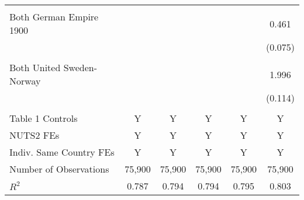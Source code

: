 {\begin{tabular}{l*{5}{c}}
            &                     &                     &                     &                     &                     \\
Both German Empire 1900&                     &                     &                     &                     &       0.461\sym{***}\\
            &                     &                     &                     &                     &     (0.075)         \\
            &                     &                     &                     &                     &                     \\
Both United Sweden-Norway&                     &                     &                     &                     &       1.996\sym{***}\\
            &                     &                     &                     &                     &     (0.114)         \\
            &                     &                     &                     &                     &                     \\
\hline
Table 1 Controls&           Y         &           Y         &           Y         &           Y         &           Y         \\
NUTS2 FEs   &           Y         &           Y         &           Y         &           Y         &           Y         \\
Indiv. Same Country FEs&           Y         &           Y         &           Y         &           Y         &           Y         \\
Number of Observations&      75,900         &      75,900         &      75,900         &      75,900         &      75,900         \\
$R^2$       &       0.787         &       0.794         &       0.794         &       0.795         &       0.803         \\
\hline\hline
\end{tabular}
}
